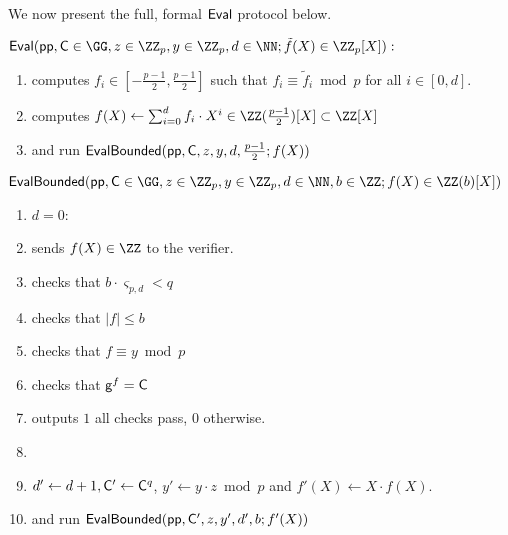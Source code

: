  We now present the full, formal $\textsf{{Eval}}$ protocol below.
\begin{mdframed}
\begin{minipage}{\textwidth}
			$\pro{Eval}(\crs, \gr{C}\in \GG, z\in \ZZ_p, y\in \ZZ_p, d \in \NN; \tilde{f}(X)\in \ZZ_p[X]) :$ 
			\begin{enumerate}[nolistsep]
			\item \prover computes $f_i \in [-\frac{p-1}{2},\frac{p-1}{2}]$ such that $f_i\equiv \tilde{f}_i\bmod p$ for all $i\in[0,d]$.
			\item \prover computes $f(X)\gets \sum_{i=0}^d f_i \cdot X^{i}\in \ZZ(\frac{p-1}{2})[X]\subset \ZZ[X]$
			\item \prover and \verifier run $\textsf{{EvalBounded}}(\textsf{pp},\mathsf{C},z,y,d,\frac{p-1}{2};f(X))$
		    \end{enumerate}
		    		\vspace{1em}
		$\pro{EvalBounded}(\crs,\gr{C}\in \GG,z\in \ZZ_p,y\in \ZZ_p,d\in \NN,b\in \ZZ;f(X)\in \ZZ(b)[X])$		
	    \begin{enumerate}[nolistsep]
        \item \pcif $d=0$:
        \item \label{line:basestart}\pcind[1] \prover sends $f(X)\in \ZZ$ to the verifier. 

        \item \pcind[1] \verifier checks that $b\cdot \boldsymbol{\varsigma}_{p,d} < q$
        \item \pcind[1] \verifier checks that $|f|\leq b$
          \item \pcind[1] \verifier checks that $f\equiv y \bmod p$
                \item \label{line:baseend}\pcind[1] \verifier checks that $\mathsf{g}^{f}=\mathsf{C}$
\item \pcind[1] \verifier outputs $1$ \pcif all checks pass, $0$ otherwise.
          \item {}
         \item \pcind[1]  $d'\gets d+1, \mathsf{C}'\gets \mathsf{C}^q$, $y'\gets y\cdot z \bmod p$ and $f'(X)\gets X \cdot f(X)$.
         \item \pcind[1] \prover and \verifier run $\textsf{{EvalBounded}}(\textsf{pp},\mathsf{C}',z,y',d',b;f'(X))$


\end{enumerate}
\end{minipage}
\end{mdframed}
